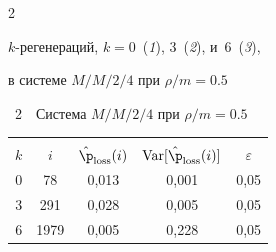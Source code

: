 \begin{multicols}{2}
{{$k$-ре\-ге\-нераций, $k=0$~(\textit{1}), 3~(\textit{2}), и~6~(\textit{3}),  


в сис\-те\-ме $M/M/2/4$ при $\rho/m=0.5$}}
















\vspace*{6pt}





\addtocounter{figure}{1}





\noindent


\begin{center}  %




{{\tablename~2}\ \ \small{Система $M/M/2/4$  при $\rho/m=0.5$}}


\vspace*{2ex}





{\small 


\tabcolsep=6.4pt


\begin{tabular}{|c|c|c|c|c|} 


\hline


&&&&\\[-9pt]


 $k$ & $i$   &$\hat{\p}_{\mathrm{loss}}(i)$ &  $\mathrm{Var}[\hat{\p}_{\mathrm{loss}}(i)]$ & $\varepsilon$ \\


 \hline


0& \hphantom{9,}78\hphantom{9}& 0,013& 0,001& 0,05\\ 


3& 291& 0,028& 0,005& 0,05\\ 


6& 1979\hphantom{9}& 0,005& 0,228&0,05\\


 \hline


\end{tabular} 


}





\end{center}
\end{multicols}
